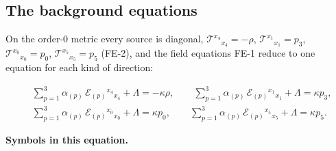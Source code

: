 \documentclass[
  10pt,
]{article}
\begin{document}
\hypertarget{the-background-equations}{%
\subsection{The background equations}\label{the-background-equations}}

On the order-0 metric every source is diagonal,
\(\mathcal{T}^{x_4}{}_{x_4} = -\rho\),
\(\mathcal{T}^{x_1}{}_{x_1} = p_3\),
\(\mathcal{T}^{x_0}{}_{x_0} = p_0\), \(\mathcal{T}^{x_5}{}_{x_5} = p_5\)
(FE-2), and the field equations FE-1 reduce to one equation for each
kind of direction:

\[
\begin{aligned}
&\sum_{p=1}^{3}\alpha_{(p)}\,\mathcal{E}_{(p)}{}^{x_4}{}_{x_4} + \Lambda = -\kappa\rho,\qquad
 \sum_{p=1}^{3}\alpha_{(p)}\,\mathcal{E}_{(p)}{}^{x_1}{}_{x_1} + \Lambda = \kappa p_3,\\
&\sum_{p=1}^{3}\alpha_{(p)}\,\mathcal{E}_{(p)}{}^{x_0}{}_{x_0} + \Lambda = \kappa p_0,\qquad
 \sum_{p=1}^{3}\alpha_{(p)}\,\mathcal{E}_{(p)}{}^{x_5}{}_{x_5} + \Lambda = \kappa p_5.
\end{aligned}
\]

\textbf{Symbols in this equation.}
\end{document}
